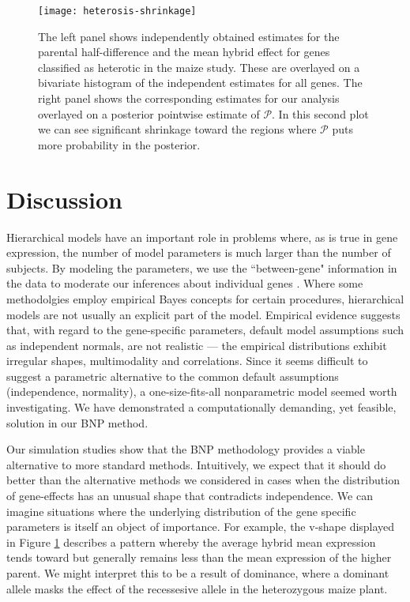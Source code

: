 
\begin{figure}[h!]
\centering
\texttt{[image: heterosis-shrinkage]}
\begin{minipage}{.8\textwidth}
\caption{\small The left panel shows independently obtained estimates for the parental half-difference and the mean hybrid effect for genes classified as heterotic in the maize study. These are overlayed on a bivariate histogram of the independent estimates for all genes. The right
panel shows the corresponding estimates for our analysis overlayed on a posterior pointwise estimate of $\mathcal{P}$. In this second plot we can see significant shrinkage toward the regions where $\mathcal{P}$ puts more probability in the posterior.}
\label{het-shrink}
\end{minipage}
\end{figure}

\section{Discussion}
\label{sec:discussion}
Hierarchical models have an important role in problems where, as is true in gene expression, the number of model parameters is much larger than the number of subjects. By modeling the parameters, we use the ``between-gene" information in the data to moderate our inferences about individual genes . Where some methodolgies employ empirical Bayes concepts for certain procedures, hierarchical models are not usually an explicit part of the model. Empirical evidence suggests that, with regard to the gene-specific parameters, default model assumptions such as independent normals, are not realistic --- the empirical distributions exhibit irregular shapes, multimodality and correlations. Since it seems difficult to suggest a parametric alternative to the common default assumptions (independence, normality), a one-size-fits-all nonparametric model seemed worth investigating. We have demonstrated a computationally demanding, yet feasible, solution in our BNP method.

Our simulation studies show that the BNP methodology provides a viable alternative to more standard methods. Intuitively, we expect that it should do better than the alternative methods we considered in cases when the distribution of gene-effects has an unusual shape that contradicts independence. We can imagine situations where the underlying distribution of the gene specific parameters is itself an object of importance. For example, the v-shape displayed in Figure \ref{het-shrink} describes a pattern whereby the average hybrid mean expression tends toward but generally remains less than the mean expression of the higher parent. We might interpret this to be a result of dominance, where a dominant allele masks the effect of the recessesive allele in the heterozygous maize plant.

